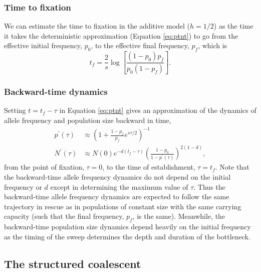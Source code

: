 \documentclass[]{article}
\begin{document}
\subsubsection*{Time to fixation}
\label{sec:fixation_time}

We can estimate the time to fixation in the additive model ($h=1/2$) as the time it takes the deterministic approximation (Equation \ref{eq:ptnt}) to go from the effective initial frequency, $p_0$, to the effective final frequency, $p_f$, which is \citep[equation 5.3.13 in ][]{crow1970introduction}
\begin{equation}\label{eq:tfix}
t_f = \frac{2}{s} \log\left[ \frac{(1-p_0)p_f}{p_0(1-p_f)}\right].
\end{equation}

\subsubsection*{Backward-time dynamics}
\label{sec:backward_dynamics}

Setting $t = t_f - \tau$ in Equation \ref{eq:ptnt} gives an approximation of the dynamics of allele frequency and population size backward in time,
\begin{equation}\begin{aligned}\label{eq:backwardsptnt}
p^\prime(\tau) &\approx \left(1 + \frac{1 - p_f}{p_f} e^{s \tau/2} \right)^{-1}\\
N^\prime(\tau) &\approx N(0) e^{-d (t_f-\tau)} \left(\frac{1-p_0}{1-p^\prime(\tau)}\right)^{2(1-d)},
\end{aligned}\end{equation}
from the point of fixation, $\tau=0$, to the time of establishment, $\tau=t_f$.
Note that the backward-time allele frequency dynamics do not depend on the initial frequency or $d$ except in determining the maximum value of $\tau$.
Thus the backward-time allele frequency dynamics are expected to follow the same trajectory in rescue as in populations of constant size with the same carrying capacity (such that the final frequency, $p_f$, is the same).
Meanwhile, the backward-time population size dynamics depend heavily on the initial frequency as the timing of the sweep determines the depth and duration of the bottleneck. 

\subsection*{The structured coalescent}
\end{document}
